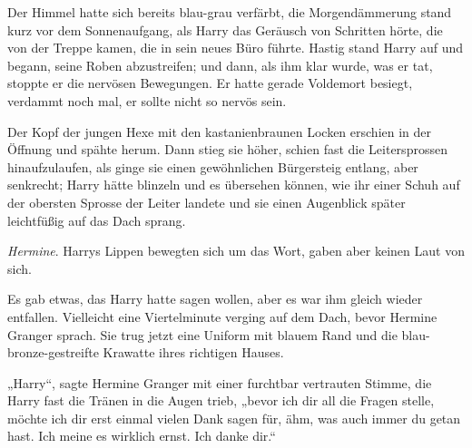 Der Himmel hatte sich bereits blau-grau verfärbt, die Morgendämmerung stand kurz vor dem Sonnenaufgang, als Harry das Geräusch von Schritten hörte, die von der Treppe kamen, die in sein neues Büro führte.
Hastig stand Harry auf und begann, seine Roben abzustreifen; und dann, als ihm klar wurde, was er tat, stoppte er die nervösen Bewegungen. Er hatte gerade Voldemort besiegt, verdammt noch mal, er sollte nicht so nervös sein.

Der Kopf der jungen Hexe mit den kastanienbraunen Locken erschien in der Öffnung und spähte herum. Dann stieg sie höher, schien fast die Leitersprossen hinaufzulaufen, als ginge sie einen gewöhnlichen Bürgersteig entlang, aber senkrecht; Harry hätte blinzeln und es übersehen können, wie ihr einer Schuh auf der obersten Sprosse der Leiter landete und sie einen Augenblick später leichtfüßig auf das Dach sprang.

\emph{Hermine}.
Harrys Lippen bewegten sich um das Wort, gaben aber keinen Laut von sich.

Es gab etwas, das Harry hatte sagen wollen, aber es war ihm gleich wieder entfallen. Vielleicht eine Viertelminute verging auf dem Dach, bevor Hermine Granger sprach. Sie trug jetzt eine Uniform mit blauem Rand und die blau-bronze-gestreifte Krawatte ihres richtigen Hauses.

„Harry“, sagte Hermine Granger mit einer furchtbar vertrauten Stimme, die Harry fast die Tränen in die Augen trieb, „bevor ich dir all die Fragen stelle, möchte ich dir erst einmal vielen Dank sagen für, ähm, was auch immer du getan hast. Ich meine es wirklich ernst. Ich danke dir.“


